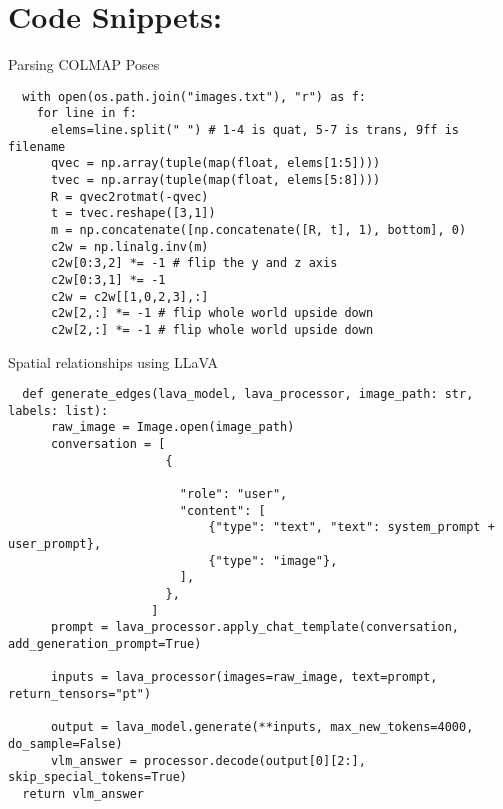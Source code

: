 \documentclass[
  a4paper,  %
  twoside,  %
  bibliography=totoc,
  headsepline,
  cleardoublepage=empty,
  parskip=half,
  draft=false
]{scrbook}
\begin{document}
\section{Code Snippets:}
\begin{listing}[ht]
  \caption{Parsing COLMAP Poses}
  \label{lst:pose}
\begin{lstlisting}
  with open(os.path.join("images.txt"), "r") as f:
    for line in f:
      elems=line.split(" ") # 1-4 is quat, 5-7 is trans, 9ff is filename 
      qvec = np.array(tuple(map(float, elems[1:5])))
      tvec = np.array(tuple(map(float, elems[5:8])))
      R = qvec2rotmat(-qvec)
      t = tvec.reshape([3,1])
      m = np.concatenate([np.concatenate([R, t], 1), bottom], 0)
      c2w = np.linalg.inv(m)
      c2w[0:3,2] *= -1 # flip the y and z axis
      c2w[0:3,1] *= -1
      c2w = c2w[[1,0,2,3],:]
      c2w[2,:] *= -1 # flip whole world upside down
      c2w[2,:] *= -1 # flip whole world upside down
\end{lstlisting}
\end{listing}
\begin{listing}[ht]
  \caption{Spatial relationships using LLaVA}
  \label{lst:llavaImpl}
\begin{lstlisting}
  def generate_edges(lava_model, lava_processor, image_path: str, labels: list):
      raw_image = Image.open(image_path) 
      conversation = [
                      {

                        "role": "user",
                        "content": [
                            {"type": "text", "text": system_prompt + user_prompt},
                            {"type": "image"},
                        ],
                      },
                    ]
      prompt = lava_processor.apply_chat_template(conversation, add_generation_prompt=True)

      inputs = lava_processor(images=raw_image, text=prompt, return_tensors="pt")

      output = lava_model.generate(**inputs, max_new_tokens=4000, do_sample=False)
      vlm_answer = processor.decode(output[0][2:], skip_special_tokens=True)
  return vlm_answer
\end{lstlisting}
\end{listing}
\end{document}

